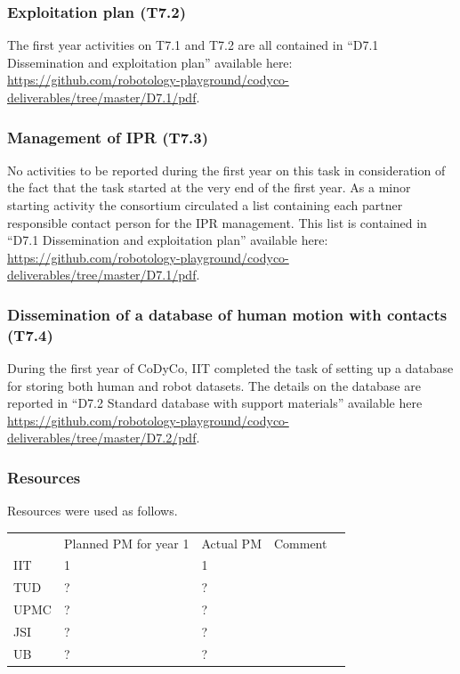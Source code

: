 \documentclass[12pt,a4paper,twoside]{article}
\begin{document}
\subsubsection{Exploitation plan (T7.2)}

The first year activities on T7.1 and T7.2 are all contained in ``D7.1 Dissemination and exploitation plan'' available here: \url{https://github.com/robotology-playground/codyco-deliverables/tree/master/D7.1/pdf}.

\subsubsection{Management of IPR (T7.3)}

No activities to be reported during the first year on this task in consideration of the fact that the task started at the very end of the first year. As a minor starting activity the consortium circulated a list containing each partner responsible contact person for the IPR management. This list is contained in ``D7.1 Dissemination and exploitation plan'' available here: \url{https://github.com/robotology-playground/codyco-deliverables/tree/master/D7.1/pdf}.

\subsubsection{Dissemination of a database of human motion with contacts (T7.4)}

During the first year of CoDyCo, IIT completed the task of setting up a database for storing both human and robot datasets. The details on the database are reported in ``D7.2 Standard database with support materials'' available here \url{https://github.com/robotology-playground/codyco-deliverables/tree/master/D7.2/pdf}. 

\subsubsection{Resources}

Resources were used as follows.

\begin{center}
\begin{tabular}{|l|l|l|l|l}
\cline{1-4}
 & Planned PM for year 1 & Actual PM & Comment & \\ \cline{1-4}
IIT        & 1 & 1 &  &  \\ \cline{1-4}
TUD    & ? & ? &  &  \\ \cline{1-4}
UPMC & ? & ? &  &  \\ \cline{1-4}
JSI       & ? & ? &  &  \\ \cline{1-4}
UB       & ? & ? &  &  \\ \cline{1-4}
\end{tabular}
\end{center}
\end{document}
